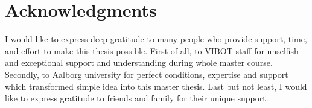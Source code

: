 \doublespacing

\setcounter{page}{1} \pagestyle{plain}


\tableofcontents

\listoffigures
\listoftables

\chapter*{Acknowledgments}
         {\protect{}}

I would like to express deep gratitude to many people who provide support, time, and effort to make this thesis possible. First of all, to VIBOT staff for unselfish and exceptional support and understanding during whole master course. Secondly, to Aalborg university for perfect conditions, expertise and support which transformed simple idea into this master thesis. Last but not least, I would like to express gratitude to friends and family for their unique support.

\pagestyle{fancy}
